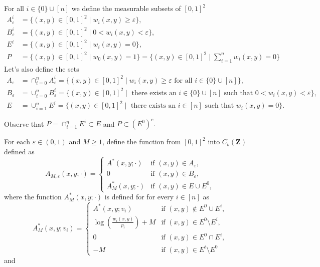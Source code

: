\documentclass[12pt,twoside,a4paper]{article}
\newcommand{\Space}{\mathbf{Z}}
\newcommand{\CbFunct}{C_b(\Space)}
\begin{document}
For all $i\in \{0\}\cup [n]$ we define the measurable subsets of $[0,1]^2$
\begin{align*}
A_{\varepsilon}^i &= \{(x,y) \in [0,1]^2 \mid w_i(x,y) \geq \varepsilon\}, \\
B_{\varepsilon}^i &= \{(x,y) \in [0,1]^2 \mid 0 < w_i(x,y) < \varepsilon \}, \\
E^i &= \{(x,y) \in [0,1]^2 \mid w_i(x,y) = 0 \},\\
P&= \{(x,y) \in [0,1]^2 \mid w_0(x,y) = 1 \}= \{(x,y) \in [0,1]^2 \mid \sum^n_{i=1}w_i(x,y) = 0 \}
\end{align*}
Let's also define the sets 
\begin{align*}
A_{\varepsilon} &= \cap^n_{i=0}A_{\varepsilon}^i=\{(x,y) \in [0,1]^2 \mid w_i(x,y) \geq \varepsilon \text{ for all }i\in \{0\}\cup [n]\}, \\
B_{\varepsilon} &=\cup^n_{i=0}B_{\varepsilon}^i=\{(x,y) \in [0,1]^2 \mid \text{ there exists an } i\in \{0\}\cup [n] \text{ such that }0 < w_i(x,y) < \varepsilon\},  \\
E &= \cup^n_{i=1}E^i=\{(x,y) \in [0,1]^2 \mid \text{ there exists an } i\in [n] \text{ such that }w_i(x,y) =0\}.
\end{align*}

Observe that $P=\cap^n_{i=1}E^i\subset E$ and $P\subset (E^0)^c.$

For each $\varepsilon \in (0,1)$ and $M \geq 1$, define the function from $[0,1]^2$ into $\CbFunct$ defined as
\[
A_{M,\varepsilon}(x,y;\cdot) =
\begin{cases}
A^*(x,y;\cdot) & \text{if } (x,y) \in A_{\varepsilon}, \\
0 & \text{if } (x,y) \in B_{\varepsilon}, \\
A_M^*(x,y;\cdot) & \text{if } (x,y) \in E\cup E^0,
\end{cases}
\]
where the function $A_M^*(x,y;\cdot)$ is defined for  for every $i\in [n]$ as 
\[
A^*_{M}(x,y;v_i) =
\begin{cases}
A^*(x,y;v_i) & \text{if } (x,y) \notin E^0\cup E^i,  \\
\log \left( \frac{w_i(x,y)}{p_i} \right)+M & \text{if } (x,y) \in E^0\setminus E^i,\\
0 & \text{if } (x,y) \in E^0\cap E^i,\\
-M & \text{if } (x,y) \in E^i\setminus E^0
\end{cases}
\]and 
\end{document}

